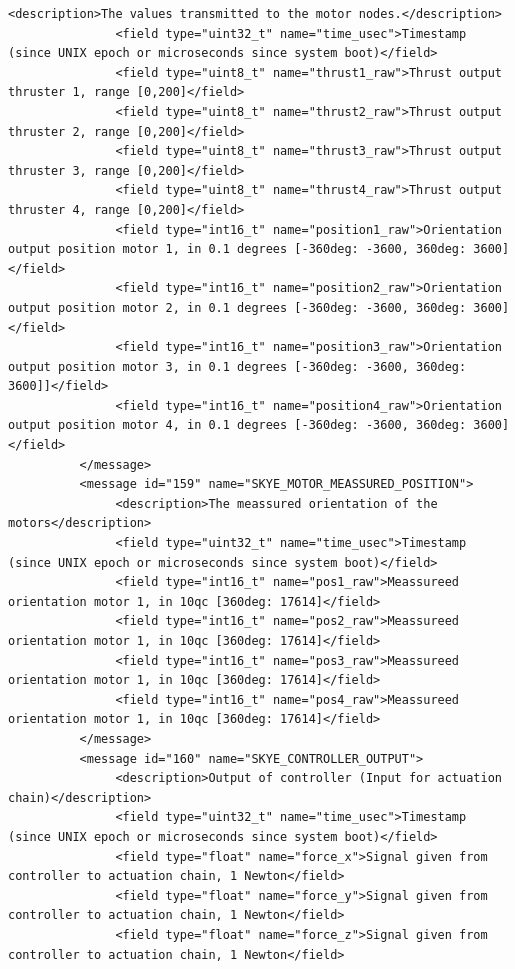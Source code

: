 \begin{lstlisting}[captionpos=b, caption="Definition of \textsc{Skye} specific Mavlink messages", label=app_xml]
               <description>The values transmitted to the motor nodes.</description>
               <field type="uint32_t" name="time_usec">Timestamp (since UNIX epoch or microseconds since system boot)</field>
               <field type="uint8_t" name="thrust1_raw">Thrust output thruster 1, range [0,200]</field>
               <field type="uint8_t" name="thrust2_raw">Thrust output thruster 2, range [0,200]</field>
               <field type="uint8_t" name="thrust3_raw">Thrust output thruster 3, range [0,200]</field>
               <field type="uint8_t" name="thrust4_raw">Thrust output thruster 4, range [0,200]</field>
               <field type="int16_t" name="position1_raw">Orientation output position motor 1, in 0.1 degrees [-360deg: -3600, 360deg: 3600]</field>
               <field type="int16_t" name="position2_raw">Orientation output position motor 2, in 0.1 degrees [-360deg: -3600, 360deg: 3600]</field>
               <field type="int16_t" name="position3_raw">Orientation output position motor 3, in 0.1 degrees [-360deg: -3600, 360deg: 3600]]</field>
               <field type="int16_t" name="position4_raw">Orientation output position motor 4, in 0.1 degrees [-360deg: -3600, 360deg: 3600]</field>
          </message>
          <message id="159" name="SKYE_MOTOR_MEASSURED_POSITION">
               <description>The meassured orientation of the motors</description>
               <field type="uint32_t" name="time_usec">Timestamp (since UNIX epoch or microseconds since system boot)</field>
               <field type="int16_t" name="pos1_raw">Meassureed orientation motor 1, in 10qc [360deg: 17614]</field>
               <field type="int16_t" name="pos2_raw">Meassureed orientation motor 1, in 10qc [360deg: 17614]</field>
               <field type="int16_t" name="pos3_raw">Meassureed orientation motor 1, in 10qc [360deg: 17614]</field>
               <field type="int16_t" name="pos4_raw">Meassureed orientation motor 1, in 10qc [360deg: 17614]</field>
          </message>
          <message id="160" name="SKYE_CONTROLLER_OUTPUT">
               <description>Output of controller (Input for actuation chain)</description>
               <field type="uint32_t" name="time_usec">Timestamp (since UNIX epoch or microseconds since system boot)</field>
               <field type="float" name="force_x">Signal given from controller to actuation chain, 1 Newton</field>
               <field type="float" name="force_y">Signal given from controller to actuation chain, 1 Newton</field>
               <field type="float" name="force_z">Signal given from controller to actuation chain, 1 Newton</field>

\end{lstlisting}
